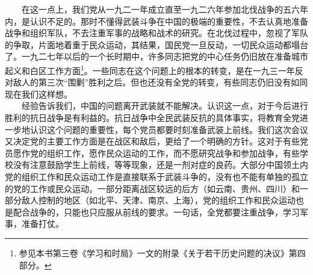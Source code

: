 \documentclass[cn,11pt,chinese]{elegantbook}
\begin{document}
　　在这一点上，我们党从一九二一年成立直至一九二六年参加北伐战争的五六年内，是认识不足的。那时不懂得武装斗争在中国的极端的重要性，不去认真地准备战争和组织军队，不去注重军事的战略和战术的研究。在北伐过程中，忽视了军队的争取，片面地着重于民众运动，其结果，国民党一旦反动，一切民众运动都塌台了。一九二七年以后的一个长时期中，许多同志把党的中心任务仍旧放在准备城市起义和白区工作方面\footnote[4]{ 参见本书第三卷《学习和时局》一文的附录《关于若干历史问题的决议》第四部分。}。一些同志在这个问题上的根本的转变，是在一九三一年反对敌人的第三次“围剿”胜利之后。但也还没有全党的转变，有些同志仍旧没有如同现在我们这样想。\\
　　经验告诉我们，中国的问题离开武装就不能解决。认识这一点，对于今后进行胜利的抗日战争是有利益的。抗日战争中全民武装反抗的具体事实，将教育全党进一步地认识这个问题的重要性，每个党员都要时刻准备武装上前线。我们这次会议又决定党的主要工作方面是在战区和敌后，更给了一个明确的方针。这对于有些党员愿作党的组织工作，愿作民众运动的工作，而不愿研究战争和参加战争，有些学校没有注意鼓励学生上前线，等等现象，还是一剂对症的良药。大部分中国领土内党的组织工作和民众运动工作是直接联系于武装斗争的，没有也不能有单独的孤立的党的工作或民众运动。一部分距离战区较远的后方（如云南、贵州、四川）和一部分敌人控制的地区（如北平、天津、南京、上海），党的组织工作和民众运动也是配合战争的，只能也只应服从前线的要求。一句话，全党都要注重战争，学习军事，准备打仗。\\
\end{document}

